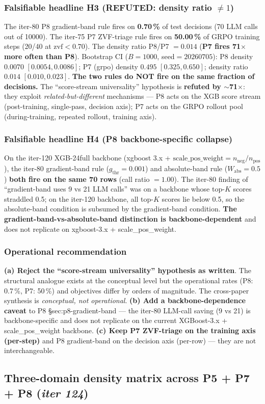 \documentclass{article}
\begin{document}
\subsubsection{Falsifiable headline H3 (REFUTED: density ratio $\neq 1$)}
The iter-80 P8 gradient-band rule fires on \textbf{0.70\,\%} of test
decisions (70 LLM calls out of 10000).  The iter-75 P7 ZVF-triage rule
fires on \textbf{50.00\,\%} of GRPO training steps (20/40 at
$\mathrm{zvf}{<}0.70$).  The density ratio P8/P7 $= 0.014$
(\textbf{P7 fires 71$\times$ more often than P8}).  Bootstrap CI
($B{=}1000$, seed$=20260705$): P8 density $0.0070$
$[0.0054, 0.0086]$; P7 (grpo) density $0.495$
$[0.325, 0.650]$; density ratio $0.014$
$[0.010, 0.023]$.  \textbf{The two rules do NOT fire on the same
fraction of decisions.}  The ``score-stream universality'' hypothesis
is \textbf{refuted by $\sim$71$\times$}: they exploit
\emph{related-but-different} mechanisms --- P8 acts on the XGB score
stream (post-training, single-pass, decision axis); P7 acts on the
GRPO rollout pool (during-training, repeated rollout, training axis).

\subsubsection{Falsifiable headline H4 (P8 backbone-specific collapse)}
On the iter-120 XGB-24full backbone (xgboost 3.x +
$\mathrm{scale\_pos\_weight}{=}n_\mathrm{neg}/n_\mathrm{pos}$), the
iter-80 gradient-band rule ($g_\mathrm{thr}{=}0.001$) and
absolute-band rule ($W_\mathrm{abs}{=}0.5$) \textbf{both fire on the
same 70 rows} (call ratio $= 1.00$).  The iter-80 finding of
``gradient-band uses 9 vs 21 LLM calls'' was on a backbone whose
top-$K$ scores straddled 0.5; on the iter-120 backbone, all top-$K$
scores lie below 0.5, so the absolute-band condition is subsumed by
the gradient-band condition.  \textbf{The gradient-band-vs-absolute-band
distinction is backbone-dependent} and does not replicate on
xgboost-3.x + scale\_pos\_weight.

\subsubsection{Operational recommendation}
\textbf{(a) Reject the ``score-stream universality'' hypothesis as written}.
The structural analogue exists at the conceptual level but the
operational rates (P8: 0.7\,\%, P7: 50\,\%) and objectives differ by
orders of magnitude.  The cross-paper synthesis is \emph{conceptual,
not operational}.  \textbf{(b) Add a backbone-dependence caveat} to
P8 \S{sec:p8-gradient-band} --- the iter-80 LLM-call saving
(9 vs 21) is backbone-specific and does not replicate on the
current XGBoost-3.x + scale\_pos\_weight backbone.  \textbf{(c) Keep
P7 ZVF-triage on the training axis (per-step)} and P8 gradient-band on
the decision axis (per-row) --- they are not interchangeable. \subsection{Three-domain density matrix across P5 + P7 + P8 (\textit{iter 124})}
\label{sec:synth-iter124-three-domain}
\end{document}
